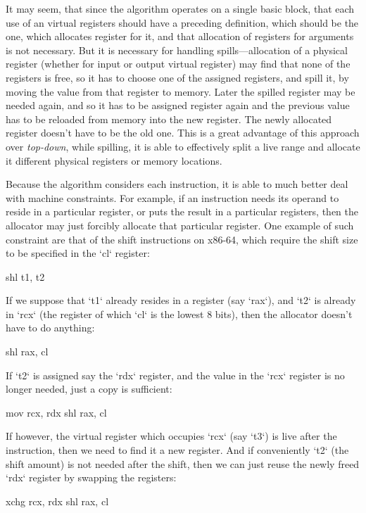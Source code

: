 It may seem, that since the algorithm operates on a single basic block, that each
use of an virtual registers should have a preceding definition, which should be
the one, which allocates register for it, and that allocation of registers for
arguments is not necessary. But it is necessary for handling spills---allocation
of a physical register (whether for input or output virtual register) may find
that none of the registers is free, so it has to choose one of the assigned
registers, and spill it, by moving the value from that register to memory. Later
the spilled register may be needed again, and so it has to be assigned register
again and the previous value has to be reloaded from memory into the new
register. The newly allocated register doesn't have to be the old one. This is a
great advantage of this approach over {\em top-down}, while spilling, it is able
to effectively split a live range and allocate it different physical registers
or memory locations.

Because the algorithm considers each instruction, it is able to much better deal
with machine constraints. For example, if an instruction needs its operand to
reside in a particular register, or puts the result in a particular registers,
then the allocator may just forcibly allocate that particular register. One
example of such constraint are that of the shift instructions on x86-64, which
require the shift size to be specified in the `cl` register:

\begtt
shl t1, t2 %
\endtt

If we suppose that `t1` already resides in a register (say `rax`), and `t2` is
already in `rcx` (the register of which `cl` is the lowest 8 bits), then the
allocator doesn't have to do anything:

\begtt
shl rax, cl %
\endtt

If `t2` is assigned say the `rdx` register, and the value in the `rcx` register
is no longer needed, just a copy is sufficient:

\begtt
mov rcx, rdx
shl rax, cl
\endtt

If however, the virtual register which occupies `rcx` (say `t3`) is live after
the instruction, then we need to find it a new register. And if conveniently
`t2` (the shift amount) is not needed after the shift, then we can just reuse
the newly freed `rdx` register by swapping the registers:

\begtt
xchg rcx, rdx
shl rax, cl
\endtt

